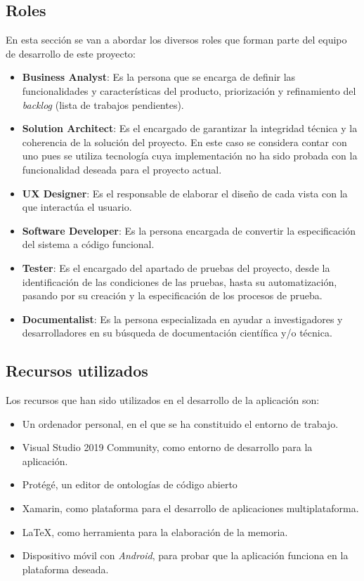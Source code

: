 \subsection{Roles}
En esta sección se van a abordar los diversos roles que forman parte del equipo de desarrollo de este proyecto:
\begin{itemize}
    \item \textbf{Business Analyst}: Es la persona que se encarga de definir las funcionalidades y características
    del producto, priorización y refinamiento del \textit{backlog} (lista de trabajos pendientes). \autocite*{businessAnalyst}

    \item \textbf{Solution Architect}: Es el encargado de garantizar la integridad técnica y la coherencia de la solución 
    del proyecto. En este caso se considera contar con uno pues se utiliza tecnología cuya implementación no ha sido probada 
    con la funcionalidad deseada para el proyecto actual. \autocite*{solutionArchitect}
    
    \item \textbf{UX Designer}: Es el responsable de elaborar el diseño de cada vista con la que interactúa el usuario. \autocite*{UXDesigner}
    
    \item \textbf{Software Developer}: Es la persona encargada de convertir la especificación del sistema a código funcional. \autocite*{Developer}
    
    \item \textbf{Tester}: Es el encargado del apartado de pruebas del proyecto, desde la identificación de las condiciones de las pruebas, 
    hasta su automatización, pasando por su creación y la especificación de los procesos de prueba. \autocite*{Tester} 
    
    \item \textbf{Documentalist}: Es la persona especializada en ayudar a investigadores y desarrolladores en su búsqueda de 
    documentación científica y/o técnica. \autocite*{Documentalist}
\end{itemize}

\subsection{Recursos utilizados}
Los recursos que han sido utilizados en el desarrollo de la aplicación son:
\begin{itemize}
    \item Un ordenador personal, en el que se ha constituido el entorno de trabajo.
    \item Visual Studio 2019 Community, como entorno de desarrollo para la aplicación.
    \item Protégé, un editor de ontologías de código abierto
    \item Xamarin, como plataforma para el desarrollo de aplicaciones multiplataforma.
    \item LaTeX, como herramienta para la elaboración de la memoria.
    \item Dispositivo móvil con \textit{Android}, para probar que la aplicación funciona en la plataforma deseada.
\end{itemize}

